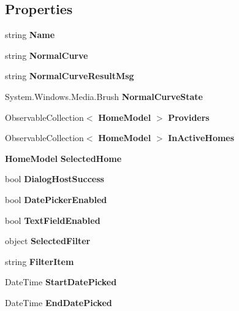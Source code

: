 \subsection*{Properties}
\begin{DoxyCompactItemize}
\item 
string \textbf{ Name}\hspace{0.3cm}{\ttfamily  [get]}
\item 
string \textbf{ Normal\+Curve}\hspace{0.3cm}{\ttfamily  [get, set]}
\item 
string \textbf{ Normal\+Curve\+Result\+Msg}\hspace{0.3cm}{\ttfamily  [get, set]}
\item 
System.\+Windows.\+Media.\+Brush \textbf{ Normal\+Curve\+State}\hspace{0.3cm}{\ttfamily  [get, set]}
\item 
Observable\+Collection$<$ \textbf{ Home\+Model} $>$ \textbf{ Providers}\hspace{0.3cm}{\ttfamily  [get, set]}
\item 
Observable\+Collection$<$ \textbf{ Home\+Model} $>$ \textbf{ In\+Active\+Homes}\hspace{0.3cm}{\ttfamily  [get, set]}
\item 
\textbf{ Home\+Model} \textbf{ Selected\+Home}\hspace{0.3cm}{\ttfamily  [get, set]}
\item 
bool \textbf{ Dialog\+Host\+Success}\hspace{0.3cm}{\ttfamily  [get, set]}
\item 
bool \textbf{ Date\+Picker\+Enabled}\hspace{0.3cm}{\ttfamily  [get, set]}
\item 
bool \textbf{ Text\+Field\+Enabled}\hspace{0.3cm}{\ttfamily  [get, set]}
\item 
object \textbf{ Selected\+Filter}\hspace{0.3cm}{\ttfamily  [get, set]}
\item 
string \textbf{ Filter\+Item}\hspace{0.3cm}{\ttfamily  [get, set]}
\item 
Date\+Time \textbf{ Start\+Date\+Picked}\hspace{0.3cm}{\ttfamily  [get, set]}
\item 
Date\+Time \textbf{ End\+Date\+Picked}\hspace{0.3cm}{\ttfamily  [get, set]}
\item 

\end{DoxyCompactItemize}
